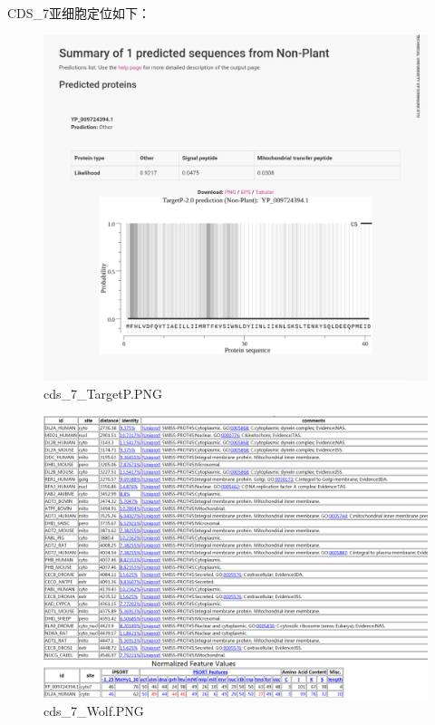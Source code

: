 \documentclass[supercite]{HustGraduPaper}
\begin{document}
	\paragraph{}\label{subpara:subpara}CDS\_7亚细胞定位如下：
	\begin{figure}[H]
		\centering
		\includegraphics[width=1\textwidth]{./material/practice2/cds_7/TargetP.jpg}
		\caption{cds\_7\_TargetP.PNG}
	\end{figure}
	\begin{figure}[H]
		\centering
		\includegraphics[width=1\textwidth]{./material/practice2/cds_7/wolf.png}
		\caption{cds\_7\_Wolf.PNG}
	\end{figure}
\end{document}

